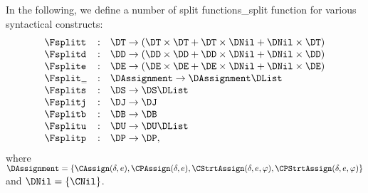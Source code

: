 \begin{docpart}
In the following, we define a number of split functions_{split function}
for various syntactical constructs:
\[
\begin{array}{lcl}
  \Fsplitt &:& \DT -> (\DT \x \DT + \DT \x \DNil + \DNil \x \DT) \\
  \Fsplitd &:& \DD -> (\DD \x \DD + \DD \x \DNil + \DNil \x \DD) \\
  \Fsplite &:& \DE -> (\DE \x \DE + \DE \x \DNil + \DNil \x \DE) \\
  \Fsplit_{=} &:& \DAssignment -> \DAssignment \DList \\
  \Fsplits &:& \DS -> \DS \DList \\
  \Fsplitj &:& \DJ -> \DJ \\
  \Fsplitb &:& \DB -> \DB \\
  \Fsplitu &:& \DU -> \DU \DList \\
  \Fsplitp &:& \DP -> \DP, \\
\end{array}
\]
where $\DAssignment = \{\CAssign(\delta,e), \CPAssign(\delta,e),
\CStrtAssign(\delta,e,\varphi), \CPStrtAssign(\delta,e,\varphi)  \}$ and
$\DNil = \{\CNil\}$.


\end{docpart}
